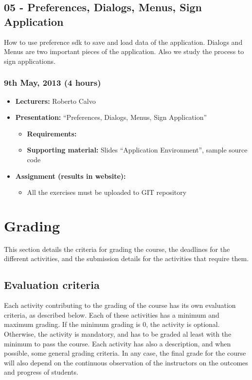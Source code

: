 \documentclass[a4paper]{article}
\begin{document}
\subsection{05 - Preferences, Dialogs, Menus, Sign Application}

How to use preference sdk to save and load data of the
application. Dialogs and Menus are two important pieces of the
application. Also we study the process to sign applications.

\subsubsection{9th May, 2013 (4 hours)}

\begin{itemize}
\item \textbf{Lecturers:} Roberto Calvo
\item \textbf{Presentation:} ``Preferences, Dialogs, Menus, Sign Application''
  \begin{itemize}
  \item \textbf{Requirements:} 
  \item \textbf{Supporting material:} Slides ``Application Environment'', sample source code 
  \end{itemize}
\item \textbf{Assignment (results in website):} 
  \begin{itemize}
  \item All the exercises must be uploaded to GIT repository
  \end{itemize}
\end{itemize}


\section{Grading}

This section details the criteria for grading the course, the
deadlines for the different activities, and the submission details for
the activities that require them.

\subsection{Evaluation criteria}
\label{sub:evaluation-criteria}

Each activity contributing to the grading of the course has its own
evaluation criteria, as described below. Each of these activities has
a minimum and maximum grading. If the minimum grading is 0, the
activity is optional. Otherwise, the activity is mandatory, and has to
be graded al least with the minimum to pass the course. Each activity
has also a description, and when possible, some general grading
criteria. In any case, the final grade for the course will also depend
on the continuous observation of the instructors on the outcomes and
progress of students.
\end{document}
